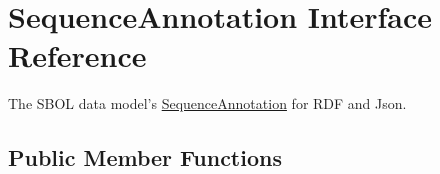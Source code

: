 \hypertarget{interfaceorg_1_1sbolstandard_1_1core_1_1_sequence_annotation}{
\section{SequenceAnnotation Interface Reference}
\label{interfaceorg_1_1sbolstandard_1_1core_1_1_sequence_annotation}
}


The SBOL data model's \hyperlink{interfaceorg_1_1sbolstandard_1_1core_1_1_sequence_annotation}{SequenceAnnotation} for RDF and Json.  


\subsection*{Public Member Functions}
